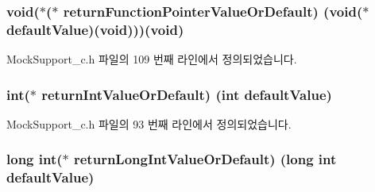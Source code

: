 \subsubsection[{\texorpdfstring{return\+Function\+Pointer\+Value\+Or\+Default}{returnFunctionPointerValueOrDefault}}]{\setlength{\rightskip}{0pt plus 5cm}void($\ast$($\ast$ return\+Function\+Pointer\+Value\+Or\+Default) (void($\ast$default\+Value)(void)))(void)}\hypertarget{struct_s_mock_actual_call__c_ab5269cbc4eeedac5d28749d686d40b1b}{}\label{struct_s_mock_actual_call__c_ab5269cbc4eeedac5d28749d686d40b1b}


Mock\+Support\+\_\+c.\+h 파일의 109 번째 라인에서 정의되었습니다.

\subsubsection[{\texorpdfstring{return\+Int\+Value\+Or\+Default}{returnIntValueOrDefault}}]{\setlength{\rightskip}{0pt plus 5cm}int($\ast$ return\+Int\+Value\+Or\+Default) (int default\+Value)}\hypertarget{struct_s_mock_actual_call__c_a781e904090c1ca3ec3b5cf085a10e2bc}{}\label{struct_s_mock_actual_call__c_a781e904090c1ca3ec3b5cf085a10e2bc}


Mock\+Support\+\_\+c.\+h 파일의 93 번째 라인에서 정의되었습니다.

\subsubsection[{\texorpdfstring{return\+Long\+Int\+Value\+Or\+Default}{returnLongIntValueOrDefault}}]{\setlength{\rightskip}{0pt plus 5cm}long int($\ast$ return\+Long\+Int\+Value\+Or\+Default) (long int default\+Value)}\hypertarget{struct_s_mock_actual_call__c_a70a97eb5b9ca3623f7ae131d427932f3}{}\label{struct_s_mock_actual_call__c_a70a97eb5b9ca3623f7ae131d427932f3}


